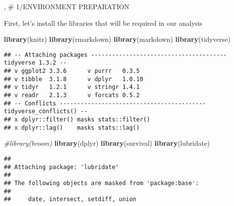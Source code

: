 \documentclass[
]{article}
\author{}
\date{\vspace{-2.5em}}
\newenvironment{Shaded}{\begin{snugshade}}{\end{snugshade}}
\newcommand{\CommentTok}[1]{\textcolor[rgb]{0.56,0.35,0.01}{\textit{#1}}}
\newcommand{\FunctionTok}[1]{\textcolor[rgb]{0.13,0.29,0.53}{\textbf{#1}}}
\newcommand{\NormalTok}[1]{#1}
\begin{document}
, \# 1/ENVIRONMENT PREPARATION

First, let's install the libraries that will be required in our analysis

\begin{Shaded}
\begin{Highlighting}[]
\FunctionTok{library}\NormalTok{(knitr) }
\FunctionTok{library}\NormalTok{(rmarkdown) }
\FunctionTok{library}\NormalTok{(markdown)}
\FunctionTok{library}\NormalTok{(tidyverse)}
\end{Highlighting}
\end{Shaded}

\begin{verbatim}
## -- Attaching packages --------------------------------------- tidyverse 1.3.2 --
## v ggplot2 3.3.6      v purrr   0.3.5 
## v tibble  3.1.8      v dplyr   1.0.10
## v tidyr   1.2.1      v stringr 1.4.1 
## v readr   2.1.3      v forcats 0.5.2 
## -- Conflicts ------------------------------------------ tidyverse_conflicts() --
## x dplyr::filter() masks stats::filter()
## x dplyr::lag()    masks stats::lag()
\end{verbatim}

\begin{Shaded}
\begin{Highlighting}[]
\CommentTok{\#library(broom)}
\FunctionTok{library}\NormalTok{(dplyr)}
\FunctionTok{library}\NormalTok{(survival)}
\FunctionTok{library}\NormalTok{(lubridate)}
\end{Highlighting}
\end{Shaded}

\begin{verbatim}
## 
## Attaching package: 'lubridate'
## 
## The following objects are masked from 'package:base':
## 
##     date, intersect, setdiff, union
\end{verbatim}
\end{document}
